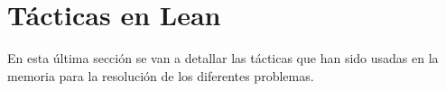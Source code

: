 \chapter{Tácticas en Lean}

En esta última sección se van a detallar las tácticas que han sido
usadas en la memoria para la resolución de los diferentes problemas.